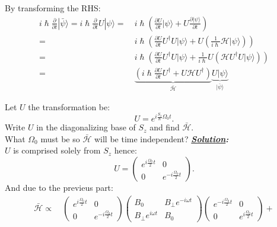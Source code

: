 \documentclass[notitlepage]{report}
\begin{document}
\begin{question}[title = Question 6]{}{}
\begin{question}[title = Part 3]{}{}
By transforming the RHS:\\
\begin{align*}
	i\hslash\frac{\partial}{\partial t}|\bar{\psi}\rangle=i\hslash\frac{\partial}{\partial t}U|\psi\rangle =&\ i\hslash\left(\frac{\partial U}{\partial t}|\psi\rangle+U\frac{\partial|\psi\rangle}{\partial t}\right)\\
	 =&\ i\hslash\left(\frac{\partial U}{\partial t}U^{\dag}U|\psi\rangle+U\left(\frac{1}{i\hslash}\mathcal{H}|\psi\rangle \right) \right)\\
	 =&\ i\hslash\left(\frac{\partial U}{\partial t}U^{\dag}U|\psi\rangle+\frac{1}{i\hslash}U\left(\mathcal{H}U^{\dag}U|\psi\rangle \right) \right)\\
	 =&\ \underbrace{\left(i\hslash\frac{\partial U}{\partial t}U^{\dag}+U\mathcal{H}U^{\dag}\right)}_{\bar{\mathcal{H}}} \underbrace{U|\psi\rangle}_{|\bar{\psi}\rangle }
\end{align*}
\end{question}
\begin{question}[title = Part 4]{}{}
Let $U$ the transformation be:\\
\[
	U=e^{i \frac{S_z}{\hslash}\Omega_0t}
.\] 
Write $U$ in the diagonalizing base of $S_z$ and find $\bar{\mathcal{H}}$.\\
What $\Omega_0$ must be so $\bar{\mathcal{H}}$ will be time independent?
\tcblower
\textbf{\emph{\underline{Solution}:}}\\
$U$ is comprised solely from $S_z$ hence:\\
 \[
	U=
	\begin{pmatrix}
		e^{i \frac{\Omega_0}{2}t} & 0\\
		0 & e^{-i \frac{\Omega_0}{2}t}
	\end{pmatrix}
.\] 
And due to the previeus part:\\
\begin{align*}
	\bar{\mathcal{H}} \propto&\ 
	\begin{pmatrix}
		e^{i \frac{\Omega_0}{2}t} & 0\\
		0 & e^{-i \frac{\Omega_0}{2}t}
	\end{pmatrix}
	\begin{pmatrix}
		B_0 & B_{\perp}e^{-i\omega t}\\
		B_{\perp}e^{i\omega t} & B_0
	\end{pmatrix}
	\begin{pmatrix}
		e^{-i \frac{\Omega_0}{2}t} & 0\\
		0 & e^{i \frac{\Omega_0}{2}t}
	\end{pmatrix}+

\end{align*}
\end{question}
\end{question}
\end{document}
